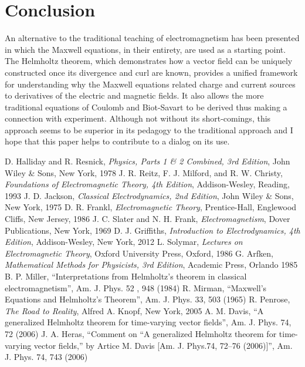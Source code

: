 \documentclass{article}
\begin{document}
\section{Conclusion}
An alternative to the traditional teaching of electromagnetism has been presented in which the Maxwell equations, 
in their entirety, are used as a starting point.  The Helmholtz theorem, which demonstrates how a vector field can be 
uniquely constructed once its divergence and curl are known, provides a unified framework for understanding why the Maxwell 
equations related charge and current sources to derivatives of the electric and magnetic fields.  It also allows the more 
traditional equations of Coulomb and Biot-Savart to be derived thus making a connection with experiment.  Although not 
without its short-comings, this approach seems to be superior in its pedagogy to the traditional approach and I hope that 
this paper helps to contribute to a dialog on its use.

\begin{thebibliography}{20}
    D. Halliday and R. Resnick, \emph{Physics, Parts 1 \& 2 Combined, 3rd Edition}, John Wiley \& Sons, New York, 1978
       J. R. Reitz, F. J. Milford, and R. W. Christy, \emph{Foundations of Electromagnetic Theory, 4th Edition}, Addison-Wesley, Reading, 1993
     J. D. Jackson, \emph{Classical Electrodynamics, 2nd Edition}, John Wiley \& Sons, New York, 1975
      D. R. Frankl, \emph{Electromagnetic Theory}, Prentice-Hall, Englewood Cliffs, New Jersey, 1986
      J. C. Slater and N. H. Frank, \emph{Electromagnetism}, Dover Publications, New York, 1969
   D. J. Griffiths, \emph{Introduction to Electrodynamics, 4th Edition}, Addison-Wesley, New York, 2012
     L. Solymar, \emph{Lectures on Electromagnetic Theory}, Oxford University Press, Oxford, 1986
      G. Arfken, \emph{Mathematical Methods for Physicists, 3rd Edition}, Academic Press, Orlando 1985
      B. P. Miller, ``Interpretations from Helmholtz’s theorem in classical electromagnetism'', Am. J. Phys. 52 , 948 (1984)
      R. Mirman, ``Maxwell's Equations and Helmholtz's Theorem'', Am. J. Phys. 33, 503 (1965)
     R. Penrose, \emph{The Road to Reality}, Alfred A. Knopf, New York, 2005
       A. M. Davis, ``A generalized Helmholtz theorem for time-varying vector fields'', Am. J. Phys. 74, 72 (2006)
       J. A. Heras, ``Comment on “A generalized Helmholtz theorem for time-varying vector fields,” by Artice M. Davis [Am. J. Phys.74, 72–76 (2006)]'', Am. J. Phys. 74, 743 (2006)
\end{thebibliography}
\end{document}
